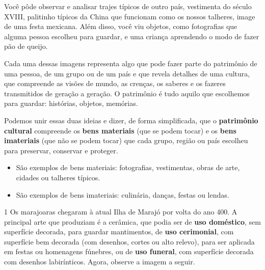 {Você pôde observar e analisar trajes típicos de outro país, vestimenta do
século XVIII, palitinho típicos da China que funcionam como os nossos talheres,
image de uma festa mexicana. Além disso, você viu objetos, como fotografias que alguma pessoa
escolheu para guardar, e uma criança aprendendo o modo de
fazer pão de queijo.

Cada uma dessas imagens representa algo que pode fazer parte do patrimônio de uma pessoa, de
um grupo ou de um país e que revela detalhes de uma cultura, que compreende as visões de mundo, as crenças, os saberes e os
fazeres transmitidos de geração a geração. O patrimônio é tudo aquilo que escolhemos para guardar: histórias,
objetos, memórias.

Podemos unir essas duas ideias e dizer, de forma
simplificada, que o \textbf{patrimônio cultural} compreende os \textbf{bens materiais}
(que se podem tocar) e os \textbf{bens imateriais} (que não se podem tocar) que cada grupo,
região ou país escolheu para preservar, conservar e proteger.

\begin{itemize}
  \item São exemplos de bens materiais: fotografias, vestimentas, obras de arte,
cidades ou talheres típicos.

\item São exemplos de bens imateriais: culinária, danças,
festas ou lendas.
\end{itemize}
}




\num{1} Os marajoaras chegaram à atual Ilha de Marajó por volta do ano 400. A principal arte que produziam é a cerâmica, que podia ser de \textbf{uso doméstico}, sem superfície decorada, para guardar mantimentos, de \textbf{uso cerimonial}, com superfície bem decorada (com desenhos, cortes ou alto relevo), para ser aplicada em festas ou homenagens fúnebres, ou de \textbf{uso funeral}, com superfície decorada com desenhos labirínticos. Agora, observe a imagem a seguir.

